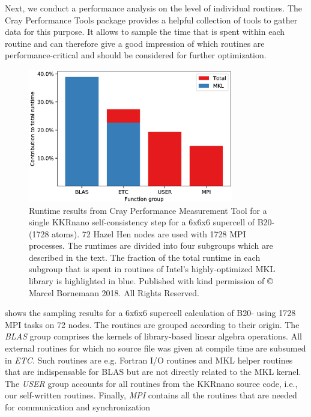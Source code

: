 \documentclass[graybox]{svmult}
\begin{document}
Next, we conduct a performance analysis on the level of individual routines.
The Cray Performance Tools package provides a helpful collection of tools to gather data for this purpose.
It allows to sample the time that is spent within each routine and can therefore give a good
impression of which routines are performance-critical and should be considered for further optimization.
\begin{figure}[htb]
\begin{center}
 \includegraphics[width=0.8\textwidth]{Figures/MnGe_6x6x6_crayreport.eps}
\end{center}
	\caption{Runtime results from Cray Performance Measurement 
	Tool for a single KKRnano self-consistency step 
	for a 6x6x6 supercell of B20- (1728 atoms). 72 Hazel Hen nodes are used with 1728 MPI processes.
	The runtimes are divided into four subgroups which are described in the text.
	The fraction of the total runtime in each subgroup that is spent in
	routines of Intel's highly-optimized MKL library is highlighted in blue.
	Published with kind permission of © Marcel Bornemann 2018. All Rights Reserved.
	}
\label{fig:MnGe_6x6x6_crayreport}
\end{figure}
 shows the sampling results for a 6x6x6 supercell calculation
of B20- using 1728 MPI tasks on 72 nodes.
The routines are grouped according to their origin. The \textit{BLAS} group comprises the kernels of
library-based linear algebra operations. 
All external routines for which no source file was given at compile time are subsumed
in \textit{ETC}. Such routines are e.g. Fortran I/O routines and MKL helper routines
that are indispensable for BLAS but are not directly related
to the MKL kernel.
The \textit{USER} group accounts for all routines from the KKRnano source code, i.e., our self-written routines.
Finally, \textit{MPI} contains all the routines that are needed for communication and synchronization
\end{document}
